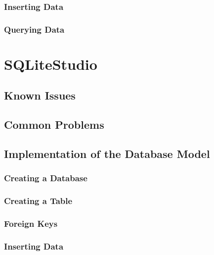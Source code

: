 \documentclass[a4paper,10pt,oneside]{article}
\begin{document}
\subsubsection{Inserting Data}
\label{dbeaverInsertingData}

\subsubsection{Querying Data}
\label{dbeaverQueryingData}


\section{SQLiteStudio}
\label{sqliteStudio}

\subsection{Known Issues}
\label{sqliteStudioKnownIssues}

\subsection{Common Problems}
\label{sqliteStudioCommonProblems}

\subsection{Implementation of the Database Model}
\label{sqliteStudioImplementation}

\subsubsection{Creating a Database}
\label{sqliteStudioCreatingDatabase}

\subsubsection{Creating a Table}
\label{sqliteStudioCreatingTable}

\subsubsection{Foreign Keys}
\label{sqliteStudioForeignKeys}

\subsubsection{Inserting Data}
\label{sqliteStudioInsertingData}
\end{document}
